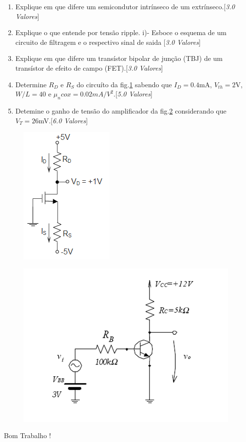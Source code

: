 \documentclass[11pt,a4paper,twoside]{report}
\begin{document}
\begin{enumerate}
\item Explique em que difere um semicondutor intr\'inseco de um extr\'inseco.[\textit{{3.0 Valores}}]
\item Explique o que entende por tens\~ao ripple. i)- Esboce o esquema de um circuito de filtragem e o respectivo sinal de saida [\textit{{3.0 Valores}}] 
\item Explique em que difere um trans\'istor bipolar de jun\c c\~ao (TBJ) de um trans\'istor de efeito de campo (FET).[\textit{3.0 Valores}]
\item Determine $R_D$ e $R_S$ do circu\'ito da fig.\ref{a} sabendo que  $I_D=0.4$mA, $V_{th}=2$V, $W/L=40$ e $\mu_n cox =0.02mA/V^{2}$.[\textit{5.0 Valores}]
 

\item Detemine o ganho de tens\~ao do amplificador da fig.\ref{f2} considerando que $V_T=26$mV.[\textit{{6.0 Valores}}]
\end{enumerate}
 \noindent
\begin{minipage}[c]{4cm}
 \begin{figure}[H]
\centering
\includegraphics[scale=0.8]{MOSFET1}
\caption{}
\label{a}
\end{figure}
\end{minipage}\hfill
\begin{minipage}[c]{9cm}
\begin{figure}[H]
\centering
\includegraphics[scale=0.87]{figplaboral}
\caption{}
\label{f2}
\end{figure}
\end{minipage}

\vspace{1.25cm}

\Huge{Bom Trabalho !}
\end{document}
